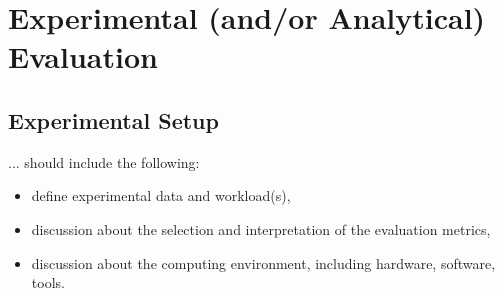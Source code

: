 \chapter{Experimental (and/or Analytical) Evaluation\label{cha:chapter4}}
\section{Experimental Setup\label{sec:exp}}
... should include the following:
\begin{itemize}

\item define experimental data and workload(s),
\item discussion about the selection and interpretation of the evaluation metrics,
\item discussion about the computing environment, including hardware, software, tools.
\end{itemize}

\begingroup
\renewcommand\thesection{5.X}



